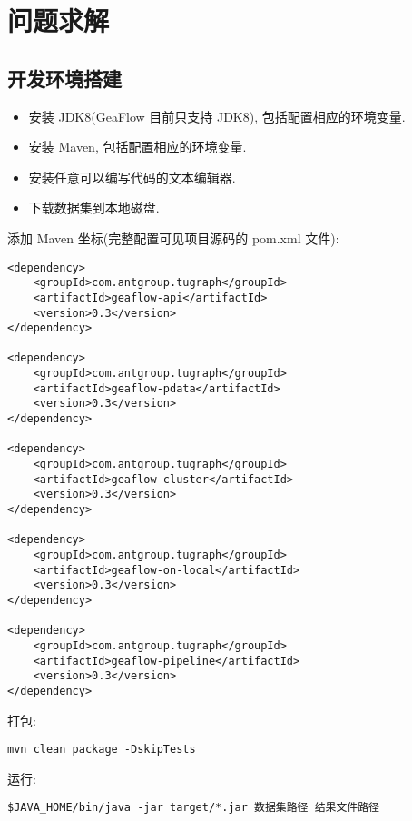 \section{问题求解}
\subsection{开发环境搭建}
\begin{itemize}
  \item 安装 JDK8(GeaFlow 目前只支持 JDK8), 包括配置相应的环境变量.
  \item 安装 Maven, 包括配置相应的环境变量.
  \item 安装任意可以编写代码的文本编辑器.
  \item 下载数据集到本地磁盘.
\end{itemize}

添加 Maven 坐标(完整配置可见项目源码的 pom.xml 文件):
\begin{center}
\begin{verbatim}
<dependency>
    <groupId>com.antgroup.tugraph</groupId>
    <artifactId>geaflow-api</artifactId>
    <version>0.3</version>
</dependency>

<dependency>
    <groupId>com.antgroup.tugraph</groupId>
    <artifactId>geaflow-pdata</artifactId>
    <version>0.3</version>
</dependency>

<dependency>
    <groupId>com.antgroup.tugraph</groupId>
    <artifactId>geaflow-cluster</artifactId>
    <version>0.3</version>
</dependency>

<dependency>
    <groupId>com.antgroup.tugraph</groupId>
    <artifactId>geaflow-on-local</artifactId>
    <version>0.3</version>
</dependency>

<dependency>
    <groupId>com.antgroup.tugraph</groupId>
    <artifactId>geaflow-pipeline</artifactId>
    <version>0.3</version>
</dependency>
\end{verbatim}
\end{center}

打包:
\begin{center}
\begin{verbatim}
mvn clean package -DskipTests
\end{verbatim}
\end{center}

运行:
\begin{center}
\begin{verbatim}
$JAVA_HOME/bin/java -jar target/*.jar 数据集路径 结果文件路径
\end{verbatim}
\end{center}

